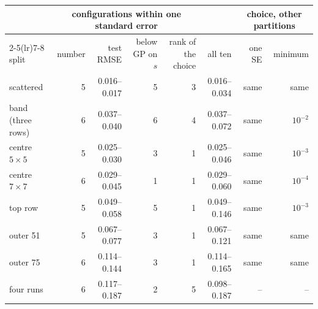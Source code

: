 \begin{tabular}{lrrrrrrr}
\toprule
 & \multicolumn{4}{c}{configurations within one standard error} & & \multicolumn{2}{c}{choice, other partitions} \\
\cmidrule(lr){2-5}\cmidrule(lr){7-8}
split & number & test RMSE & below GP on $s$ & rank of the choice & all ten & one SE & minimum \\
\midrule
scattered & 5 & 0.016--0.017 & 5 & 3 & 0.016--0.034 & same & same \\
band (three rows) & 6 & 0.037--0.040 & 6 & 4 & 0.037--0.072 & same & $10^{-2}$ \\
centre $5\times5$ & 5 & 0.025--0.030 & 3 & 1 & 0.025--0.046 & same & $10^{-3}$ \\
centre $7\times7$ & 6 & 0.029--0.045 & 1 & 1 & 0.029--0.060 & same & $10^{-4}$ \\
top row & 5 & 0.049--0.058 & 5 & 1 & 0.049--0.146 & same & $10^{-3}$ \\
outer 51 & 5 & 0.067--0.077 & 3 & 1 & 0.067--0.121 & same & same \\
outer 75 & 6 & 0.114--0.144 & 3 & 1 & 0.114--0.165 & same & same \\
\midrule
four runs & 6 & 0.117--0.187 & 2 & 5 & 0.098--0.187 & -- & -- \\
\bottomrule
\end{tabular}
